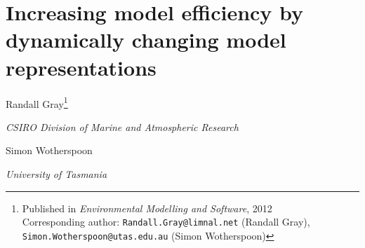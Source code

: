   

\chapter[INCREASING MODEL EFFICIENCY BY DYNAMICALLY CHANGING MODEL REPRESENTATIONS]{Increasing model efficiency by dynamically changing model representations}\label{modelefficiency}

\begin{center}
    Randall Gray\footnote{
     {Published in \emph{Environmental Modelling and Software}, 2012}\\
       Corresponding author:
      \texttt{Randall.Gray@limnal.net} (Randall Gray),\\
      \texttt{Simon.Wotherspoon@utas.edu.au} (Simon Wotherspoon)
    }

    \emph{CSIRO Division of Marine and Atmospheric Research}

    Simon Wotherspoon 

    \emph{University of Tasmania}
\end{center}

